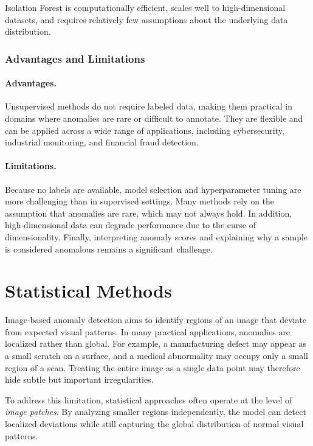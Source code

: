 \documentclass{article}
\begin{document}
Isolation Forest is computationally efficient, scales well to high-dimensional
datasets, and requires relatively few assumptions about the underlying data
distribution.

\subsubsection{Advantages and Limitations}

\paragraph{Advantages.}
Unsupervised methods do not require labeled data, making them practical in
domains where anomalies are rare or difficult to annotate. They are flexible
and can be applied across a wide range of applications, including cybersecurity,
industrial monitoring, and financial fraud detection.

\paragraph{Limitations.}
Because no labels are available, model selection and hyperparameter tuning are
more challenging than in supervised settings. Many methods rely on the
assumption that anomalies are rare, which may not always hold. In addition,
high-dimensional data can degrade performance due to the curse of
dimensionality. Finally, interpreting anomaly scores and explaining why a
sample is considered anomalous remains a significant challenge.

\section{Statistical Methods}

Image-based anomaly detection aims to identify regions of an image that deviate
from expected visual patterns. In many practical applications, anomalies are
localized rather than global. For example, a manufacturing defect may appear as
a small scratch on a surface, and a medical abnormality may occupy only a small
region of a scan. Treating the entire image as a single data point may therefore
hide subtle but important irregularities.

To address this limitation, statistical approaches often operate at the level
of \emph{image patches}. By analyzing smaller regions independently, the model
can detect localized deviations while still capturing the global distribution
of normal visual patterns.
\end{document}
